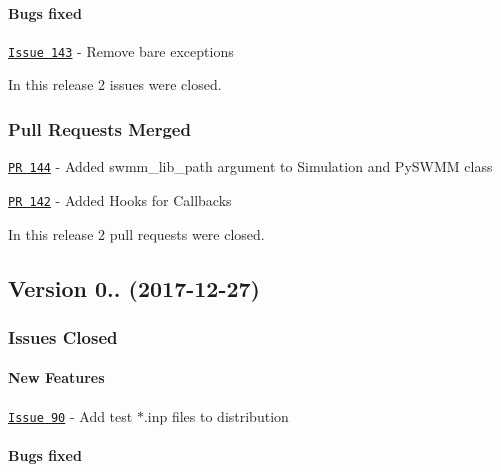 \paragraph*{Bugs fixed}


\begin{DoxyItemize}
\item \href{https://github.com/OpenWaterAnalytics/pyswmm/issues/143}{\tt Issue 143} -\/ Remove bare exceptions
\end{DoxyItemize}

In this release 2 issues were closed.

\subsubsection*{Pull Requests Merged}


\begin{DoxyItemize}
\item \href{https://github.com/OpenWaterAnalytics/pyswmm/pull/144}{\tt PR 144} -\/ Added swmm\+\_\+lib\+\_\+path argument to Simulation and Py\+S\+W\+MM class
\item \href{https://github.com/OpenWaterAnalytics/pyswmm/pull/142}{\tt PR 142} -\/ Added Hooks for Callbacks
\end{DoxyItemize}

In this release 2 pull requests were closed.

\subsection*{Version 0.. (2017-\/12-\/27)}

\subsubsection*{Issues Closed}

\paragraph*{New Features}


\begin{DoxyItemize}
\item \href{https://github.com/OpenWaterAnalytics/pyswmm/issues/90}{\tt Issue 90} -\/ Add test $\ast$.inp files to distribution
\end{DoxyItemize}

\paragraph*{Bugs fixed}


